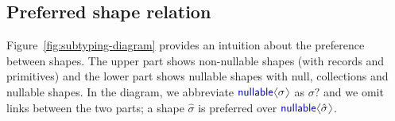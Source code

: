 \documentclass[10pt,preprint,blind,clearpagebib]{sigplanconf}
\newcommand{\langl}{\begin{picture}(4.5,7)
\put(1.1,2.5){\rotatebox{60}{\line(1,0){5.5}}}
\put(1.1,2.5){\rotatebox{300}{\line(1,0){5.5}}}
\end{picture}}
\newcommand{\rangl}{\begin{picture}(4.5,7)
\put(.9,2.5){\rotatebox{120}{\line(1,0){5.5}}}
\put(.9,2.5){\rotatebox{240}{\line(1,0){5.5}}}
\end{picture}}
\newcommand{\kvd}[1]{\textnormal{\textcolor{kvdclr}{\sffamily #1}}}
\begin{document}

\subsection{Preferred shape relation}
\label{sec:inference-subtyping}

Figure~\ref{fig:subtyping-diagram} provides an intuition about the preference between 
shapes. The upper part shows non-nullable shapes (with records and primitives) and the lower part 
shows nullable shapes with \kvd{null}, collections and nullable shapes. In the diagram, we 
abbreviate $\kvd{nullable}\langl\sigma\rangl$ as $\sigma?$ and we omit links between the two parts;
a shape $\hat{\sigma}$ is preferred over $\kvd{nullable}\langl\hat{\sigma}\rangl$.
\end{document}
